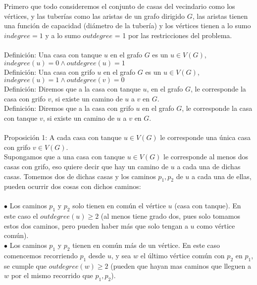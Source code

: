 \documentclass{article}
\begin{document}
    Primero que todo consideremos el conjunto de casas del vecindario como los v\'ertices, y las tuber\'ias como las aristas de un grafo
    dirigido  $G$, las aristas tienen una funci\'on de capacidad (di\'ametro de la tuber\'ia) y los v\'ertices tienen a lo sumo $indegree = 1$
    y a lo sumo $outdegree$ = 1 por las restricciones del problema.\\\\

    Definici\'on: Una casa con tanque $u$ en el grafo $G$ es un $u \in V(G)$,\\ $indegree(u) = 0 \wedge outdegree(u) = 1$\\

    Definici\'on: Una casa con grifo $u$ en el grafo $G$ es un $u \in V(G)$,\\ $indegree(u) = 1 \wedge outdegree(v) = 0$\\

    Definici\'on: Diremos que a la casa con tanque $u$, en el grafo $G$, le corresponde la casa con grifo
     $v$, si existe un camino de $u$ a $v$ en $G$.\\

    Definici\'on: Diremos que a la casa con grifo $u$ en el 
    grafo $G$, le corresponde la casa con tanque $v$, si existe un camino de $u$ a $v$ en $G$.\\\\

    Proposici\'on 1: A cada casa con tanque $u \in V(G)$ le corresponde una \'unica casa con grifo $v \in V(G)$.\\

    Supongamos que a una casa con tanque $u \in V(G)$ le corresponde al menos dos casas con grifo, eso quiere decir
    que hay un camino de $u$ a cada una de dichas casas. Tomemos dos de dichas casas y los caminos $p_1, p_2$ de $u$
    a cada una de ellas, pueden ocurrir dos cosas con dichos caminos:\\\\

    $\bullet$ Los caminos $p_1$ y $p_2$ solo tienen en com\'un el v\'ertice $u$ (casa con tanque). En este caso
    el $outdegree(u) \geq 2$ (al menos tiene grado dos, pues solo tomamos estos dos caminos, pero pueden haber m\'as que
    solo tengan a $u$ como v\'ertice com\'un).\\

    $\bullet$ Los caminos $p_1$ y $p_2$ tienen en com\'un m\'as de un v\'ertice. En este caso comencemos recorriendo $p_1$ desde
    $u$, y sea $w$ el \'ultimo v\'ertice com\'un con $p_2$ en $p_1$, se cumple que $outdegree(w) \geq 2$ (pueden que hayan mas caminos
    que lleguen a $w$ por el mismo recorrido que $p_1, p_2$).\\\\
\end{document}
